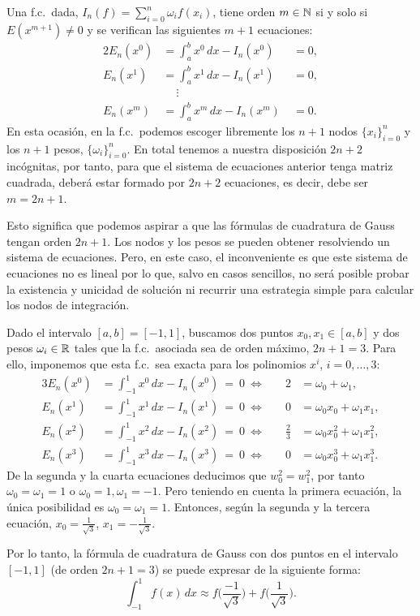 Una f.c.\ dada, $I_n(f)=\sum_{i=0}^n \omega_i f(x_i)$, tiene orden
$m\in\operatorname{{\mathbb N}}$ si y solo si $E(x^{m+1})\neq 0$ y se verifican las
siguientes $m+1$ ecuaciones:
\begin{alignat*}{2}
  E_n(x^0)&=\int_a^b x^0\, dx -I_n(x^0)&\; =0, \\
  E_n(x^1)&=\int_a^b x^1\, dx -I_n(x^1)&\; =0, \\
  &~\quad\vdots \\
  E_n(x^m)&=\int_a^b x^m\, dx -I_n(x^m)&\; =0.
\end{alignat*}
En esta ocasión, en la f.c.\ podemos escoger libremente los $n+1$ nodos
$\{x_i\}_{i=0}^n$ y los $n+1$ pesos, $\{\omega_i\}_{i=0}^n$. En total
tenemos a nuestra disposición $2n+2$ incógnitas, por tanto, para que
el sistema de ecuaciones anterior tenga matriz cuadrada, deberá estar
formado por $2n+2$ ecuaciones, es decir, debe ser $m=2n+1$.

Esto significa que podemos aspirar a que las fórmulas de cuadratura de
Gauss tengan orden $2n+1$. Los nodos y los pesos se pueden obtener
resolviendo un sistema de ecuaciones. Pero, en este caso, el
inconveniente es que este sistema de ecuaciones no es lineal por lo
que, salvo en casos sencillos, no será posible probar la
existencia y unicidad de solución ni recurrir una estrategia simple
para calcular los nodos de integración.


\begin{example}
  Dado el intervalo $[a,b]=[-1,1]$, buscamos dos puntos $x_0,x_1\in
  [a,b]$ y dos pesos $\omega_i\in\operatorname{{\mathbb R}}$ tales que la f.c.\ asociada sea
  de orden máximo, $2n+1=3$. Para ello, imponemos que esta f.c.\ sea exacta
  para los polinomios $x^i$, $i=0,\dots,3$:
  \begin{alignat*}{3}
    E_n(x^0)&=\int_{-1}^1 x^0\, dx - I_n(x^0)\ =\ 0 \ \Leftrightarrow
    \quad & 2 &= \omega_0+\omega_1,\\
    E_n(x^1)&=\int_{-1}^1 x^1\, dx - I_n(x^1)\ =\ 0 \ \Leftrightarrow
    \quad & 0 &=  \omega_0x_0+\omega_1x_1,\\
    E_n(x^2)&=\int_{-1}^1 x^2\, dx - I_n(x^2)\ =\ 0 \ \Leftrightarrow
    \quad & \frac{2}{3} &= \omega_0x_0^2+\omega_1x_1^2,\\
    E_n(x^3)&=\int_{-1}^1 x^3\, dx - I_n(x^3)\ =\ 0 \ \Leftrightarrow
    \quad &0 &=
    \omega_0x_0^3+\omega_1x_1^3.
  \end{alignat*}
  De la segunda y la cuarta ecuaciones deducimos que $w_0^2=w_1^2$,
  por tanto $\omega_0=\omega_1=1$ o $\omega_0=1, \omega_1=-1$.  Pero
  teniendo en cuenta la primera ecuación, la única posibilidad es
  $\omega_0=\omega_1=1$. Entonces, según la segunda y la tercera
  ecuación, $x_0=\frac{1}{\sqrt 3}$, $x_1=-\frac{1}{\sqrt 3}$.

  Por lo tanto, la fórmula de cuadratura de Gauss con dos puntos en el
  intervalo $[-1,1]$ (de orden $2n+1=3$) se puede expresar de la
  siguiente forma:
  \begin{equation*}
    \int_{-1}^1 f(x)\, dx \approx f\Big( \frac{-1}{\sqrt 3} \Big)
    + f\Big(\frac{1}{\sqrt 3}\Big).
  \end{equation*}
\end{example}


